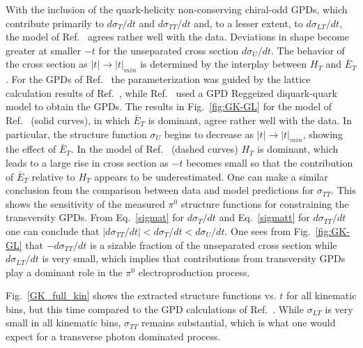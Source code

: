 \documentclass[prc,floatfix,twocolumn,superscriptaddress,letter]{revtex4}
\begin{document}
 With the inclusion of the quark-helicity non-conserving  chiral-odd GPDs, which  contribute primarily to $d\sigma_T/dt$ and  $d\sigma_{TT}/dt$  and, to a lesser extent, to $d\sigma_{LT}/dt$, the model of Ref.~\cite{GK-ps-11} agrees rather well with the data. Deviations in shape become greater at smaller $-t$ for the unseparated cross section $d\sigma_U/dt$. The behavior of the cross section as $|t| \to |t|_{min}$ is determined by the interplay between $H_T$ and $\bar E_T$. 
For the GPDs of Ref.~\cite{GK-ps-11}  the parameterization was guided by the lattice calculation results of Ref.~\cite{Goekeler},  while Ref.~\cite{Goldstein:2010gu} used a GPD Reggeized diquark-quark model to obtain the GPDs.
The results  in Fig.~\ref{fig:GK-GL} 
for  the model of Ref.~\cite{GK-ps-11} (solid curves), in which  $\bar E_T$  is dominant,  agree rather well with the data. In particular, the  structure function $\sigma_U$ begins to decrease as $|t |\to |t|_{min}$, showing the effect of $\bar E_T$.    In the model of 
Ref.~\cite{Goldstein:2010gu}  (dashed curves) $H_T$ is dominant, which leads to a large rise in cross section as $-t$ becomes small so that the contribution of $\bar E_T$  relative to $H_T$ appears to be underestimated.
One can make a similar  conclusion from  the comparison between data and model predictions for  
$\sigma_{TT}$. This  shows the sensitivity of the measured  $\pi^0$ structure functions  for constraining  the transversity GPDs.
From Eq.~\ref{sigmat} for $d\sigma_T/dt$ and Eq.~\ref{sigmatt} for $d\sigma_{TT}/dt$ one can conclude that $|d\sigma_{TT}/dt|<d\sigma_T/dt<d\sigma_U/dt$.
One sees from Fig.~\ref{fig:GK-GL} that $-d\sigma_{TT}/dt$ is a sizable fraction of the unseparated cross section while $d\sigma_{LT}/dt$ is very small, which implies that contributions from transversity GPDs play a dominant  role in the $\pi^0$ electroproduction process.

Fig.~\ref{GK_full_kin} shows the extracted structure functions vs. $t$ for all kinematic bins, 
but this time compared to the GPD calculations
of  Ref.~\cite{GK-ps-11}. While $\sigma_{LT}$ is very small in all kinematic bins, $\sigma_{TT}$ remains substantial, which is what one would expect for a transverse photon  dominated process.
\end{document}
